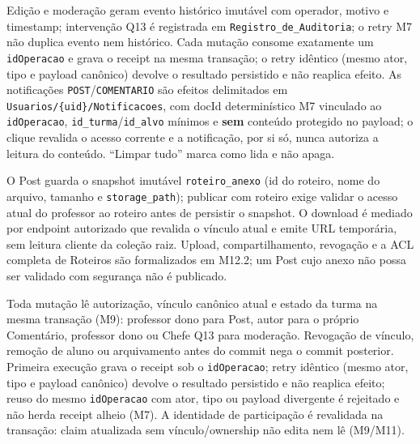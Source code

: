 \begin{regra}
Edição e moderação geram evento histórico imutável com operador, motivo e
timestamp; intervenção Q13 é registrada em \texttt{Registro\_de\_Auditoria}; o
retry M7 não duplica evento nem histórico. Cada mutação consome exatamente um
\texttt{idOperacao} e grava o receipt na mesma transação; o retry idêntico
(mesmo ator, tipo e payload canônico) devolve o resultado persistido e não
reaplica efeito. As notificações \texttt{POST}/\texttt{COMENTARIO} são efeitos
delimitados em \texttt{Usuarios/\{uid\}/Notificacoes}, com docId determinístico
M7 vinculado ao \texttt{idOperacao}, \texttt{id\_turma}/\texttt{id\_alvo}
mínimos e \textbf{sem} conteúdo protegido no payload; o clique revalida o
acesso corrente e a notificação, por si só, nunca autoriza a leitura do
conteúdo. ``Limpar tudo'' marca como lida e não apaga.
\end{regra}

\begin{regra}
O Post guarda o snapshot imutável \texttt{roteiro\_anexo} (id do roteiro, nome
do arquivo, tamanho e \texttt{storage\_path}); publicar com roteiro exige
validar o acesso atual do professor ao roteiro antes de persistir o snapshot.
O download é mediado por endpoint autorizado que revalida o vínculo atual e
emite URL temporária, sem leitura cliente da coleção raiz. Upload,
compartilhamento, revogação e a ACL completa de Roteiros são formalizados em
M12.2; um Post cujo anexo não possa ser validado com segurança não é publicado.
\end{regra}

\begin{regra}[Composição M7/M9]
Toda mutação lê autorização, vínculo canônico atual e estado da turma na mesma
transação (M9): professor dono para Post, autor para o próprio Comentário,
professor dono ou Chefe Q13 para moderação. Revogação de vínculo, remoção de
aluno ou arquivamento antes do commit nega o commit posterior. Primeira
execução grava o receipt sob o \texttt{idOperacao}; retry idêntico (mesmo ator,
tipo e payload canônico) devolve o resultado persistido e não reaplica efeito;
reuso do mesmo \texttt{idOperacao} com ator, tipo ou payload divergente é
rejeitado e não herda receipt alheio (M7). A identidade de participação é
revalidada na transação: claim atualizada sem vínculo/ownership não edita nem
lê (M9/M11).
\end{regra}

